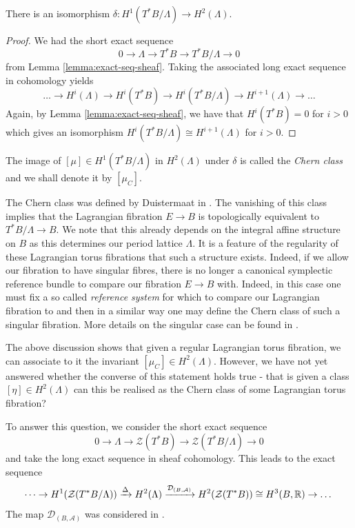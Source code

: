\begin{theorem}
    There is an isomorphism $\delta: H^1(T^*B/\Lambda) \to H^2(\Lambda)$.
\end{theorem}

\begin{proof}
    We had the short exact sequence
    $$
        0 \to \Lambda \to T^*B \to T^*B / \Lambda \to 0
    $$
    from Lemma \ref{lemma:exact-seq-sheaf}. Taking the associated long exact sequence in cohomology yields
    $$
        \dots \to H^i(\Lambda) \to H^i(T^*B) \to H^i(T^*B/\Lambda) \to H^{i+1}(\Lambda) \to \dots
    $$
    Again, by Lemma \ref{lemma:exact-seq-sheaf}, we have that $H^i(T^*B) = 0$ for $i>0$ which gives an isomorphism $H^i(T^*B/\Lambda) \cong H^{i+1}(\Lambda)$ for $i>0$.
\end{proof}

\begin{definition}
    The image of $[\mu] \in H^1(T^*B/\Lambda)$ in $H^2(\Lambda)$ under $\delta$ is called the \emph{Chern class} and we shall denote it by $[\mu_C]$.
\end{definition}

The Chern class was defined by Duistermaat in \cite{ActionAngle}. The vanishing
of this class implies that the Lagrangian fibration $E \to B$ is topologically
equivalent to $T^*B/\Lambda \to B$. We note that this already depends on the
integral affine structure on $B$ as this determines our period lattice
$\Lambda$. It is a feature of the regularity of these Lagrangian torus
fibrations that such a structure exists. Indeed, if we allow our fibration to
have singular fibres, there is no longer a canonical symplectic reference
bundle to compare our fibration $E \to B$ with. Indeed, in this case one must
fix a so called \emph{reference system} for which to compare our Lagrangian
fibration to and then in a similar way one may define the Chern class of such a
singular fibration. More details on the singular case can be found in
\cite{zung2001symplectictopologyintegrablehamiltonian}.

The above discussion shows that given a regular Lagrangian torus fibration, we
can associate to it the invariant $[\mu_{C}] \in H^2(\Lambda)$. However, we
have not yet answered whether the converse of this statement holds true - that
is given a class $[\eta] \in H^2(\Lambda)$ can this be realised as the Chern
class of some Lagrangian torus fibration?

To answer this question, we consider the short exact sequence $$ 0 \to \Lambda
    \to \mathcal{Z} (T^*B) \to \mathcal{Z}(T^*B/\Lambda) \to 0 $$ and take the long
exact sequence in sheaf cohomology. This leads to the exact sequence $$ \dots
    \to H^1(\mathcal{Z}(T^*B/\Lambda)) \xrightarrow{\Delta} H^2(\Lambda)
    \xrightarrow{\mathcal{D}_{(B, \mathcal{A})}} H^2(\mathcal{Z} (T^*B)) \cong
    H^3(B, \mathbb{R}) \to \dots $$ The map $\mathcal{D}_{(B, \mathcal{A})}$ was considered
in \cite{dazord}.

